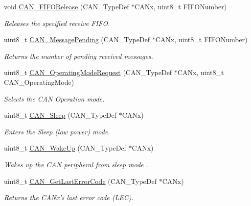 \begin{DoxyCompactItemize}
void \hyperlink{group___c_a_n_ga1bc3b39471e579b4101624c33d27918b}{C\-A\-N\-\_\-\-F\-I\-F\-O\-Release} (C\-A\-N\-\_\-\-Type\-Def $\ast$C\-A\-Nx, uint8\-\_\-t F\-I\-F\-O\-Number)
\begin{DoxyCompactList}\small\item\em Releases the specified receive F\-I\-F\-O. \end{DoxyCompactList}\item 
uint8\-\_\-t \hyperlink{group___c_a_n_ga7100459a95ce1b3cfe8ab15e112029fe}{C\-A\-N\-\_\-\-Message\-Pending} (C\-A\-N\-\_\-\-Type\-Def $\ast$C\-A\-Nx, uint8\-\_\-t F\-I\-F\-O\-Number)
\begin{DoxyCompactList}\small\item\em Returns the number of pending received messages. \end{DoxyCompactList}\item 
uint8\-\_\-t \hyperlink{group___c_a_n_gab2a3630e9e3024114eb117d14e514208}{C\-A\-N\-\_\-\-Operating\-Mode\-Request} (C\-A\-N\-\_\-\-Type\-Def $\ast$C\-A\-Nx, uint8\-\_\-t C\-A\-N\-\_\-\-Operating\-Mode)
\begin{DoxyCompactList}\small\item\em Selects the C\-A\-N Operation mode. \end{DoxyCompactList}\item 
uint8\-\_\-t \hyperlink{group___c_a_n_ga640215e38765759d7eceb8a039046667}{C\-A\-N\-\_\-\-Sleep} (C\-A\-N\-\_\-\-Type\-Def $\ast$C\-A\-Nx)
\begin{DoxyCompactList}\small\item\em Enters the Sleep (low power) mode. \end{DoxyCompactList}\item 
uint8\-\_\-t \hyperlink{group___c_a_n_ga78cdfbf1884b9e33c552bcbca15bed10}{C\-A\-N\-\_\-\-Wake\-Up} (C\-A\-N\-\_\-\-Type\-Def $\ast$C\-A\-Nx)
\begin{DoxyCompactList}\small\item\em Wakes up the C\-A\-N peripheral from sleep mode . \end{DoxyCompactList}\item 
uint8\-\_\-t \hyperlink{group___c_a_n_gaaee721a392b6b21bfd15dc160aeb6924}{C\-A\-N\-\_\-\-Get\-Last\-Error\-Code} (C\-A\-N\-\_\-\-Type\-Def $\ast$C\-A\-Nx)
\begin{DoxyCompactList}\small\item\em Returns the C\-A\-Nx's last error code (L\-E\-C). \end{DoxyCompactList}\item 

\end{DoxyCompactItemize}
